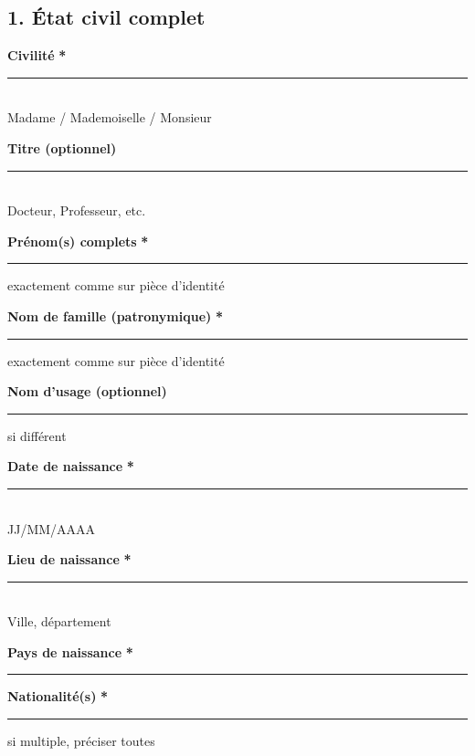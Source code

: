 \documentclass[12pt, a4paper]{article}
\newcommand{\required}{\textcolor{redalert}{\textbf{*}}}
\newcommand{\formfield}[2][]{%
    \par\noindent
    \begin{minipage}[t]{0.3\textwidth}
        \textbf{#2} \required
    \end{minipage}%
    \begin{minipage}[t]{0.68\textwidth}
        \rule{\linewidth}{0.4pt}%
        \ifblank{#1}{}{%
            \vspace{0.1cm}\newline
            {\tiny \textcolor{ethicGreenLight}{#1}}%
        }%
    \end{minipage}%
    \par\vspace{0.2cm}%
}
\newcommand{\formfieldOpt}[2][]{%
    \par\noindent
    \begin{minipage}[t]{0.3\textwidth}
        \textbf{#2}
    \end{minipage}%
    \begin{minipage}[t]{0.68\textwidth}
        \rule{\linewidth}{0.4pt}%
        \ifblank{#1}{}{%
            \vspace{0.1cm}\newline
            {\tiny \textcolor{ethicGreenLight}{#1}}%
        }%
    \end{minipage}%
    \par\vspace{0.2cm}%
}
\begin{document}
\begin{sectionbox}
    \subsection*{1.  État civil complet}
    
    \vspace{0.2cm}
    \noindent
    \begin{minipage}[t]{0.48\textwidth}
        \textbf{Civilité} \required \\
        \rule{\linewidth}{0.4pt} \\
        {\tiny \textcolor{ethicGreenLight}{Madame / Mademoiselle / Monsieur}}
    \end{minipage}%
    \hfill
    \begin{minipage}[t]{0.48\textwidth}
        \textbf{Titre (optionnel)} \\
        \rule{\linewidth}{0.4pt} \\
        {\tiny \textcolor{ethicGreenLight}{Docteur, Professeur, etc.}}
    \end{minipage}
    
    \formfield{Prénom(s) complets}{exactement comme sur pièce d'identité}
    \formfield{Nom de famille (patronymique)}{exactement comme sur pièce d'identité}
    \formfieldOpt{Nom d'usage (optionnel)}{si différent}
    
    \vspace{0.3cm}
    \noindent
    \begin{minipage}[t]{0.32\textwidth}
        \textbf{Date de naissance} \required \\
        \rule{\linewidth}{0.4pt} \\
        {\tiny \textcolor{ethicGreenLight}{JJ/MM/AAAA}}
    \end{minipage}%
    \hfill
    \begin{minipage}[t]{0.32\textwidth}
        \textbf{Lieu de naissance} \required \\
        \rule{\linewidth}{0.4pt} \\
        {\tiny \textcolor{ethicGreenLight}{Ville, département}}
    \end{minipage}%
    \hfill
    \begin{minipage}[t]{0.32\textwidth}
        \textbf{Pays de naissance} \required \\
        \rule{\linewidth}{0.4pt}
    \end{minipage}
    
    \formfield{Nationalité(s)}{si multiple, préciser toutes}
\end{sectionbox}
\end{document}
